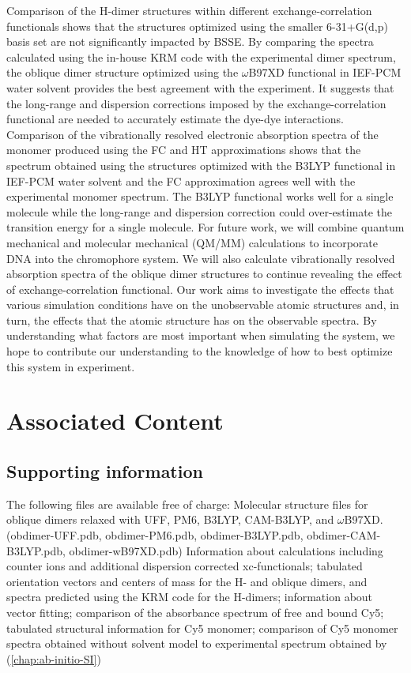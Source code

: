 Comparison of the H-dimer structures within different exchange-correlation functionals shows that the structures optimized using the smaller 6-31+G(d,p) basis set are not significantly impacted by BSSE. By comparing the spectra calculated using the in-house KRM code with the experimental dimer spectrum, the oblique dimer structure optimized using the $\omega$B97XD functional in IEF-PCM water solvent provides the best agreement with the experiment. It suggests that the long-range and dispersion corrections imposed by the exchange-correlation functional are needed to accurately estimate the dye-dye interactions. Comparison of the vibrationally resolved electronic absorption spectra of the monomer produced using the FC and HT approximations shows that the spectrum obtained using the structures optimized with the B3LYP functional in IEF-PCM water solvent and the FC approximation agrees well with the experimental monomer spectrum. The B3LYP functional works well for a single molecule while the long-range and dispersion correction could over-estimate the transition energy for a single molecule. For future work, we will combine quantum mechanical and molecular mechanical (QM/MM) calculations to incorporate DNA into the chromophore system. We will also calculate vibrationally resolved absorption spectra of the oblique dimer structures to continue revealing the effect of exchange-correlation functional. Our work aims to investigate the effects that various simulation conditions have on the unobservable atomic structures and, in turn, the effects that the atomic structure has on the observable spectra. By understanding what factors are most important when simulating the system, we hope to contribute our understanding to the knowledge of how to best optimize this system in experiment.

\section{Associated Content}
\subsection{Supporting information}
The following files are available free of charge:
Molecular structure files for oblique dimers relaxed with UFF, PM6, B3LYP, CAM-B3LYP, and $\omega$B97XD. (obdimer-UFF.pdb, obdimer-PM6.pdb, obdimer-B3LYP.pdb, obdimer-CAM-B3LYP.pdb, obdimer-wB97XD.pdb)
Information about calculations including counter ions and additional dispersion corrected xc-functionals; tabulated orientation vectors and centers of mass for the H- and oblique dimers, and spectra predicted using the KRM code for the H-dimers; information about vector fitting; comparison of the absorbance spectrum of free and bound Cy5; tabulated structural information for Cy5 monomer; comparison of Cy5 monomer spectra obtained without solvent model to experimental spectrum obtained by \cite{Cannon2017} (\autoref{chap:ab-initio-SI})

